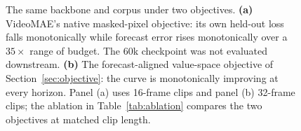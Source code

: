 \begin{figure}[t]
\begin{tikzpicture}
\end{tikzpicture}
\caption{The same backbone and corpus under two objectives. \textbf{(a)} VideoMAE's native
masked-pixel objective: its own held-out loss falls monotonically while forecast error rises
monotonically over a $35\times$ range of budget. The 60k checkpoint was not evaluated downstream.
\textbf{(b)} The forecast-aligned value-space objective of Section~\ref{sec:objective}: the curve is
monotonically improving at every horizon. Panel (a) uses 16-frame clips and panel (b) 32-frame
clips; the ablation in Table~\ref{tab:ablation} compares the two objectives at matched clip length.}
\label{fig:budget}
\end{figure}
